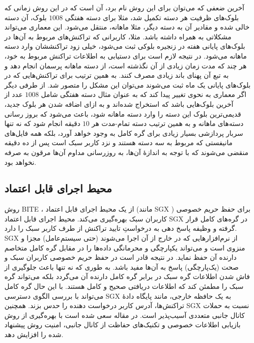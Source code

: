 آخرین ضعفی که می‌توان برای این روش \cite{Qin2019} نام برد، آن است که در این روش زمانی که بلوک‌های ظرفیت هر دسته تکمیل شد، مثلا برای دسته هفتگی $1008$ بلوک، آن دسته خالی شده و مقادیر آن به دسته دیگر، مثلا ماهانه، منتقل می‌شود. این معماری می‌تواند مشکلاتی به همراه داشته باشد. مثلا، کاربرانی که تراکنش‌های مربوط به آن‌ها در بلوک‌های پایانی هفته در زنجیره بلوکی ثبت می‌شود، خیلی زود تراکنششان وارد دسته ماهانه می‌شود. در نتیجه لازم است برای دستیابی به اطلاعات تراکنش مربوط به خود، هر چند که مدت زمان زیادی از آن نگذشته است، از دسته ماهانه پرسمان انجام دهد و به تبع آن پهنای باند زیادی مصرف کنند. به همین ترتیب برای تراکنش‌هایی که در بلوک‌های پایانی یک ماه ثبت می‌شوند می‌توان این مشکل را متصور شد. از طرفی دیگر اگر معماری به نحوی تغییر پیدا کند که به عنوان مثال دسته هفتگی شامل $1008$ عدد از آخرین بلوک‌هایی باشد که استخراج شده‌اند و به ازای اضافه شدن هر بلوک جدید، قدیمی‌ترین بلوک این دسته را وارد دسته ماهانه شود، باعث می‌شود که بروز رسانی دسته‌های ماهانه و به همین ترتیب دسته تمام-مدت هر $10$ دقیقه انجام شود که نه تنها سربار پردازشی بسیار زیادی برای گره کامل به وجود خواهد آورد، بلکه همه فایل‌های مانیفستی که مربوط به سه دسته هستند و نزد کاربر سبک است پس از ده دقیقه منقضی می‌شوند که با توجه به اندازه‌ٔ آن‌ها، به روزرسانی مداوم آن‌ها مرقون به صرفه نخواهد بود.

\subsection{محیط اجرای قابل اعتماد}
\label{SGX}

روش BITE
\cite{Matetic2019}
، از یک محیط اجرای قابل اعتماد (مانند 
SGX
\cite{SGX})
برای حفظ حریم خصوصی کاربران سبک بهره‌گیری می‌کند. 
محیط اجرای قابل اعتماد SGX در گره‌های کامل قرار گرفته و وظیفه پاسخ دهی به درخواستِ تایید تراکنش از طرف کاربر سبک را دارد. SGX از نرم‌افزارهایی که در خارج از آن اجرا می‌شوند (حتی سیستم‌عامل) مجزا و منزوی است و می‌تواند یکپارچگی و محرمانگی داده‌ها را در مقابل گره کامل متخاصم دارنده آن حفظ نماید. در نتیجه قادر است در حفظ حریم خصوصی کاربران سبک و صحت (یک‌پارچگی) پاسخ‌ به آن‌‌ها مفید باشد. به طوری که نه تنها باعث جلوگیری از فاش شدن اطلاعات گره سبک در برابر گره کامل دارنده آن می‌گردد بلکه می‌تواند گره سبک را مطمئن کند که اطلاعات دریافتی صحیح و کامل هستند. با این حال گره کامل می‌تواند با بررسی الگوی دسترسی SGX به یک حافظه خارجی،‌ مانند پایگاه‌ دادهٔ‌ تراکنش‌ها، آدرس کاربر درخواست دهنده را حدس بزند. همچنین SGX نسبت به حملات کانال جانبی متعددی آسیب‌پذیر است. در مقاله \cite{Matetic2019} سعی شده است با بهره‌گیری از روش بازیابی اطلاعات خصوصی و تکنیک‌های حفاظت از کانال جانبی، امنیت روش پیشنهاد شده را افزایش دهد.


